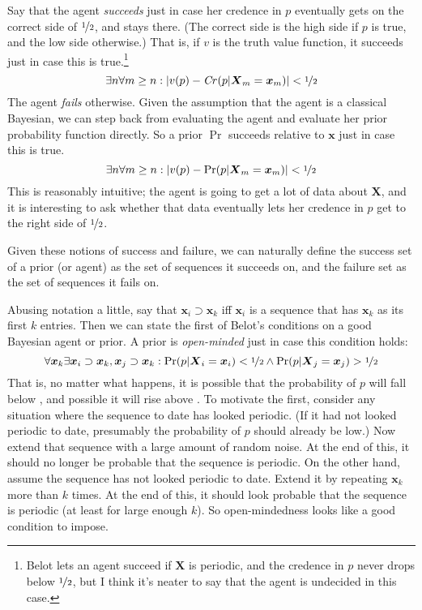 \documentclass{ergoclass}
\newcommand{\vx}{\boldsymbol{x}}
\newcommand{\vX}{\boldsymbol{X}}
\begin{document}
Say that the agent \textit{succeeds} just in case her credence in $p$ eventually gets on the correct side of $\nicefrac{1}{2}$, and stays there. (The correct side is the high side if $p$ is true, and the low side otherwise.) That is, if $v$ is the truth value function, it succeeds just in case this is true.\footnote{Belot lets an agent succeed if $\vX$ is periodic, and the credence in $p$ never drops below $\nicefrac{1}{2}$, but I think it's neater to say that the agent is undecided in this case.}
\[
\exists n \forall m \geq n: |v(p) - \textit{Cr}\mkern2mu(p | \vX_m = \vx_m)| < \nicefrac{1}{2}
\]
The agent \textit{fails} otherwise. Given the assumption that the agent is a classical Bayesian, we can step back from evaluating the agent and evaluate her prior probability function directly. So a prior $\Pr$ succeeds relative to $\vx$ just in case this is true.
\[
\exists n \forall m \geq n: |v(p) - \Pr(p | \vX_m = \vx_m)| < \nicefrac{1}{2}
\]
This is reasonably intuitive; the agent is going to get a lot of data about $\vX$, and it is interesting to ask whether that data eventually lets her credence in $p$ get to the right side of $\nicefrac{1}{2}$. 

Given these notions of success and failure, we can naturally define the success set of a prior (or agent) as the set of sequences it succeeds on, and the failure set as the set of sequences it fails on.

Abusing notation a little, say that $\vx_i \supset \vx_k$ iff $\vx_i$ is a sequence that has $\vx_k$ as its first $k$ entries. Then we can state the first of Belot's conditions on a good Bayesian agent or prior. A prior  is \textit{open-minded} just in case this condition holds:
\[
\forall \vx_k \exists \vx_i \supset \vx_k, \vx_j \supset \vx_k: \Pr(p | \vX_i = \vx_i) < \nicefrac{1}{2} \wedge \Pr(p | \vX_j = \vx_j) > \nicefrac{1}{2}
\]
That is, no matter what happens, it is possible that the probability of $p$ will fall below , and possible it will rise above . To motivate the first, consider any situation where the sequence to date has looked periodic. (If it had not looked periodic to date, presumably the probability of $p$ should already be low.) Now extend that sequence with a large amount of random noise. At the end of this, it should no longer be probable that the sequence is periodic. On the other hand, assume the sequence has not looked periodic to date. Extend it by repeating $\vx_k$ more than $k$ times. At the end of this, it should look probable that the sequence is periodic (at least for large enough $k$). So open-minded\-ness looks like a good condition to impose.
\end{document}
